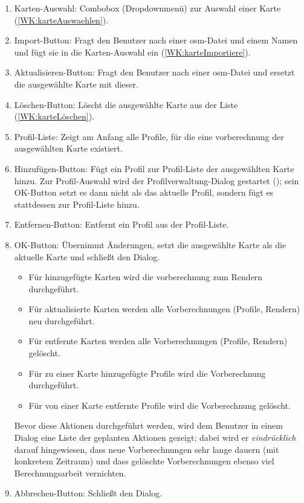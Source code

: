 \documentclass[a4paper, 11pt]{article}
\begin{document}
\begin{enumerate}
\item Karten-Auswahl: Combobox (Dropdownmenü) zur Auswahl einer Karte (\ref{WK:karteAuswaehlen}).
\item Import-Button: Fragt den Benutzer nach einer \gls{osm}-Datei und einem Namen und fügt sie in die Karten-Auswahl ein (\ref{WK:karteImportiere}).
\item Aktualisieren-Button: Fragt den Benutzer nach einer \gls{osm}-Datei und ersetzt die ausgewählte Karte mit dieser.
\item Löschen-Button: Löscht die ausgewählte Karte aus der Liste (\ref{WK:karteLöschen}).
\item Profil-Liste: Zeigt am Anfang alle Profile, für die eine \gls{vorberechnung} der ausgewählten Karte existiert.
\item Hinzufügen-Button: Fügt ein Profil zur Profil-Liste der ausgewählten Karte hinzu. Zur Profil-Auswahl wird der Profilverwaltung-Dialog gestartet (); sein OK-Button setzt es dann nicht als das aktuelle Profil, sondern fügt es stattdessen zur Profil-Liste hinzu.
\item Entfernen-Button: Entfernt ein Profil aus der Profil-Liste.
\item OK-Button: Übernimmt Änderungen, setzt die ausgewählte Karte als die aktuelle Karte und schließt den Dialog.
  \begin{itemize}
  \item Für hinzugefügte Karten wird die \gls{vorberechnung} zum Rendern durchgeführt.
  \item Für aktualisierte Karten werden alle Vorberechnungen (Profile, Rendern) neu durchgeführt.
  \item Für entfernte Karten werden alle Vorberechnungen (Profile, Rendern) gelöscht.
  \item Für zu einer Karte hinzugefügte Profile wird die Vorberechnung durchgeführt.
  \item Für von einer Karte entfernte Profile wird die Vorberechnung gelöscht.
  \end{itemize}
  Bevor diese Aktionen durchgeführt werden, wird dem Benutzer in einem Dialog eine Liste der geplanten Aktionen gezeigt; dabei wird er \emph{eindrücklich} darauf hingewiesen, dass neue Vorberechnungen sehr lange dauern (mit konkretem Zeitraum) und dass gelöschte Vorberechnungen ebenso viel Berechnungsarbeit vernichten.
\item Abbrechen-Button: Schließt den Dialog.
\end{enumerate}
\end{document}
